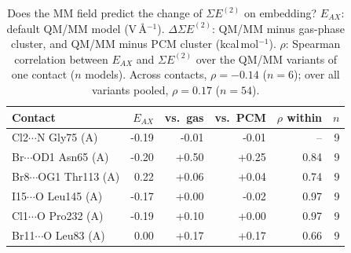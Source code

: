\begin{table}[!htbp]\centering\small
\caption{Does the MM field predict the change of $\Sigma E^{(2)}$ on embedding? $E_{AX}$: default QM/MM model (V\,\AA$^{-1}$). $\Delta\Sigma E^{(2)}$: QM/MM minus gas-phase cluster, and QM/MM minus PCM cluster (kcal\,mol$^{-1}$). $\rho$: Spearman correlation between $E_{AX}$ and $\Sigma E^{(2)}$ over the QM/MM variants of one contact ($n$ models). Across contacts, $\rho = -0.14$ ($n = 6$); over all variants pooled, $\rho = 0.17$ ($n = 54$).}\label{tab:m12}
\begin{tabular}{lrrrrr}\toprule Contact & $E_{AX}$ & vs.\ gas & vs.\ PCM & $\rho$ within & $n$\\\midrule
Cl2$\cdots$N Gly75 (A) & -0.19 & -0.01 & -0.01 & -- & 9\\
Br$\cdots$OD1 Asn65 (A) & -0.20 & +0.50 & +0.25 & 0.84 & 9\\
Br8$\cdots$OG1 Thr113 (A) & 0.22 & +0.06 & +0.04 & 0.74 & 9\\
I15$\cdots$O Leu145 (A) & -0.17 & +0.00 & -0.02 & 0.97 & 9\\
Cl1$\cdots$O Pro232 (A) & -0.19 & +0.10 & +0.00 & 0.97 & 9\\
Br11$\cdots$O Leu83 (A) & 0.00 & +0.17 & +0.17 & 0.66 & 9\\
\bottomrule\end{tabular}\end{table}

